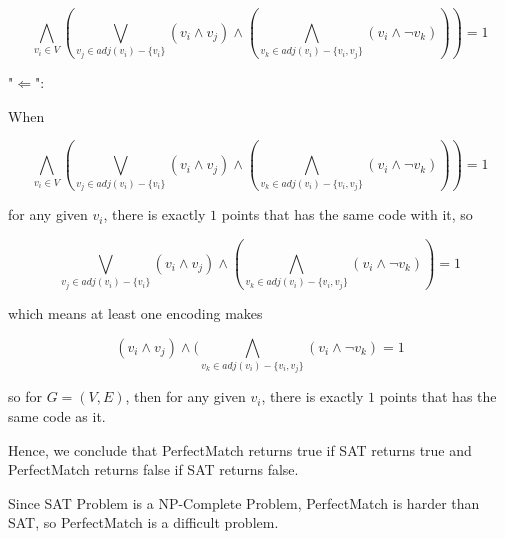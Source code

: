 \documentclass[11pt]{article}
\begin{document}
\begin{solution}
		\[\bigwedge_{v_i \in V} (\bigvee_{v_j \in adj(v_i) - \{v_i\}} (v_i \wedge v_j) \wedge (\bigwedge_{v_k \in adj(v_i) - \{v_i, v_j\}} (v_i \wedge \neg v_k) )) = 1\]
		
		"$\Leftarrow$":
		
		When 
		
		\[\bigwedge_{v_i \in V} (\bigvee_{v_j \in adj(v_i) - \{v_i\}} (v_i \wedge v_j) \wedge (\bigwedge_{v_k \in adj(v_i) - \{v_i, v_j\}} (v_i \wedge \neg v_k) )) = 1\]
		
		for any given $v_i$, there is exactly $1$ points that has the same code with it, so
		
		\[\bigvee_{v_j \in adj(v_i) - \{v_i\}} (v_i \wedge v_j) \wedge (\bigwedge_{v_k \in adj(v_i) - \{v_i, v_j\}} (v_i \wedge \neg v_k) ) = 1\]
		
		which means at least one encoding makes 
		
		\[(v_i \wedge v_j) \wedge (\bigwedge_{v_k \in adj(v_i) - \{v_i, v_j\}} (v_i \wedge \neg v_k) = 1\]
		
		so for $G = (V, E)$, then for any given $v_i$, there is exactly $1$ points that has the same code as it.
		
		Hence, we conclude that PerfectMatch returns true if SAT returns true and PerfectMatch returns false if SAT returns false.
		
		Since SAT Problem is a NP-Complete Problem, PerfectMatch is harder than SAT, so PerfectMatch is a difficult problem.
		
			
\end{solution}
\clearpage
\end{document}
